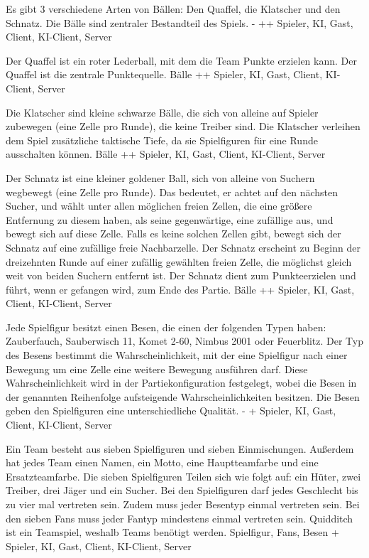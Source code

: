         {Es gibt 3 verschiedene Arten von Bällen: Den Quaffel, die Klatscher und den Schnatz.}
        {Die Bälle sind zentraler Bestandteil des Spiels.}
        {-}
        {++}
        {Spieler, KI, Gast, Client, KI-Client, Server}

        {Der Quaffel ist ein roter Lederball, mit dem die Team Punkte erzielen kann.}
        {Der Quaffel ist die zentrale Punktequelle.}
        {Bälle}
        {++}
        {Spieler, KI, Gast, Client, KI-Client, Server}

        {Die Klatscher sind kleine schwarze Bälle, die sich von alleine auf Spieler zubewegen (eine Zelle pro Runde), die keine Treiber sind.}
        {Die Klatscher verleihen dem Spiel zusätzliche taktische Tiefe, da sie Spielfiguren für eine Runde ausschalten können.}
        {Bälle}
        {++}
        {Spieler, KI, Gast, Client, KI-Client, Server}

        {Der Schnatz ist eine kleiner goldener Ball, sich von alleine von Suchern wegbewegt (eine Zelle pro Runde). Das bedeutet, er achtet auf den nächsten Sucher, und wählt unter allen möglichen freien Zellen, die eine größere Entfernung zu diesem haben, als seine gegenwärtige, eine zufällige aus, und bewegt sich auf diese Zelle. Falls es keine solchen Zellen gibt, bewegt sich der Schnatz auf eine zufällige freie Nachbarzelle. Der Schnatz erscheint zu Beginn der dreizehnten Runde auf einer zufällig gewählten freien Zelle, die möglichst gleich weit von beiden Suchern entfernt ist.}
        {Der Schnatz dient zum Punkteerzielen und führt, wenn er gefangen wird, zum Ende des Partie.}
        {Bälle}
        {++}
        {Spieler, KI, Gast, Client, KI-Client, Server}

        {Jede Spielfigur besitzt einen Besen, die einen der folgenden Typen haben: Zauberfauch, Sauberwisch 11, Komet 2-60, Nimbus 2001 oder Feuerblitz. Der Typ des Besens bestimmt die Wahrscheinlichkeit, mit der eine Spielfigur nach einer Bewegung um eine Zelle eine weitere Bewegung ausführen darf. Diese Wahrscheinlichkeit wird in der Partiekonfiguration festgelegt, wobei die Besen in der genannten Reihenfolge aufsteigende Wahrscheinlichkeiten besitzen.}
        {Die Besen geben den Spielfiguren eine unterschiedliche Qualität.}
        {-}
        {+}
        {Spieler, KI, Gast, Client, KI-Client, Server}
        
        {Ein Team besteht aus sieben Spielfiguren und sieben Einmischungen. Außerdem hat jedes Team einen Namen, ein Motto, eine Hauptteamfarbe und eine Ersatzteamfarbe. Die sieben Spielfiguren Teilen sich wie folgt auf:  ein Hüter, zwei Treiber, drei Jäger und ein Sucher. Bei den Spielfiguren darf jedes Geschlecht bis zu vier mal vertreten sein. Zudem muss jeder Besentyp einmal vertreten sein. Bei den sieben Fans muss jeder Fantyp mindestens einmal vertreten sein.}
        {Quidditch ist ein Teamspiel, weshalb Teams benötigt werden.}
        {Spielfigur, Fans, Besen}
        {+}
        {Spieler, KI, Gast, Client, KI-Client, Server}

